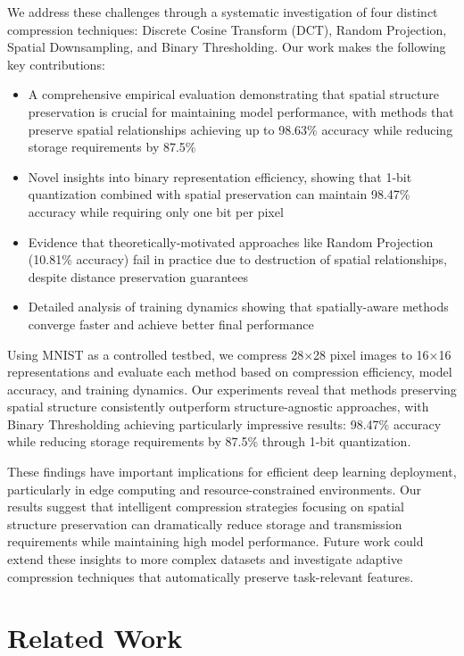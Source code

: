\documentclass{article} %
\begin{document}
We address these challenges through a systematic investigation of four distinct compression techniques: Discrete Cosine Transform (DCT), Random Projection, Spatial Downsampling, and Binary Thresholding. Our work makes the following key contributions:

\begin{itemize}
    \item A comprehensive empirical evaluation demonstrating that spatial structure preservation is crucial for maintaining model performance, with methods that preserve spatial relationships achieving up to 98.63\% accuracy while reducing storage requirements by 87.5\%
    \item Novel insights into binary representation efficiency, showing that 1-bit quantization combined with spatial preservation can maintain 98.47\% accuracy while requiring only one bit per pixel
    \item Evidence that theoretically-motivated approaches like Random Projection (10.81\% accuracy) fail in practice due to destruction of spatial relationships, despite distance preservation guarantees
    \item Detailed analysis of training dynamics showing that spatially-aware methods converge faster and achieve better final performance
\end{itemize}

Using MNIST as a controlled testbed, we compress 28$\times$28 pixel images to 16$\times$16 representations and evaluate each method based on compression efficiency, model accuracy, and training dynamics. Our experiments reveal that methods preserving spatial structure consistently outperform structure-agnostic approaches, with Binary Thresholding achieving particularly impressive results: 98.47\% accuracy while reducing storage requirements by 87.5\% through 1-bit quantization.

These findings have important implications for efficient deep learning deployment, particularly in edge computing and resource-constrained environments. Our results suggest that intelligent compression strategies focusing on spatial structure preservation can dramatically reduce storage and transmission requirements while maintaining high model performance. Future work could extend these insights to more complex datasets and investigate adaptive compression techniques that automatically preserve task-relevant features.

\section{Related Work}
\label{sec:related}
\end{document}
